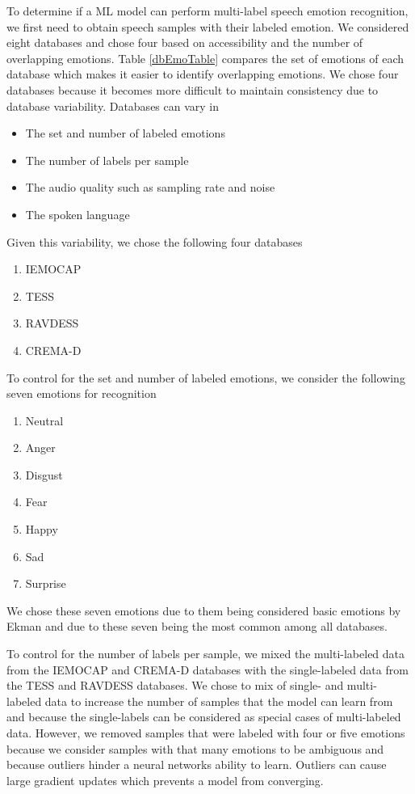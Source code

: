 To determine if a ML model can perform multi-label speech emotion recognition, we first need to obtain speech samples with their labeled emotion. We considered eight databases and chose four based on accessibility and the number of overlapping emotions. Table \ref{dbEmoTable} compares the set of emotions of each database which makes it easier to identify overlapping emotions. We chose four databases because it becomes more difficult to maintain consistency due to database variability. Databases can vary in
\begin{itemize}
	\item The set and number of labeled emotions
	\item The number of labels per sample
	\item The audio quality such as sampling rate and noise
	\item The spoken language
\end{itemize}
Given this variability, we chose the following four databases
\begin{enumerate}
	\item IEMOCAP \cite{busso_2008}
	\item TESS \cite{dupuis_2011}
	\item RAVDESS \cite{livingstone_2018}
	\item CREMA-D \cite{cao_2014}
\end{enumerate}

To control for the set and number of labeled emotions, we consider the following seven emotions for recognition
\begin{enumerate}
	\item Neutral
	\item Anger
	\item Disgust
	\item Fear
	\item Happy
	\item Sad
	\item Surprise
\end{enumerate}
We chose these seven emotions due to them being considered basic emotions by Ekman \cite{Ekman1992} and due to these seven being the most common among all databases. 

To control for the number of labels per sample, we mixed the multi-labeled data from the IEMOCAP and CREMA-D databases with the single-labeled data from the TESS and RAVDESS databases. We chose to mix of single- and multi- labeled data to increase the number of samples that the model can learn from and because the single-labels can be considered as special cases of multi-labeled data. However, we removed samples that were labeled with four or five emotions because we consider samples with that many emotions to be ambiguous and because outliers hinder a neural networks ability to learn. Outliers can cause large gradient updates which prevents a model from converging.

